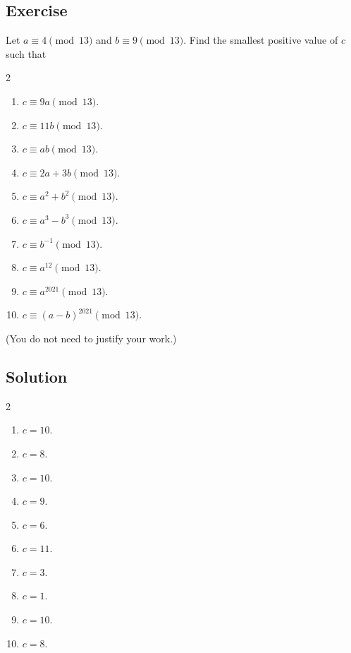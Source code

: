 \documentclass{article}
\newcounter{counter}
\newcommand{\Exercise}{Exercise \stepcounter{counter}\thecounter}
\begin{document}
\subsection*{\Exercise}
    Let $a \equiv 4 \pmod{13}$ and $b \equiv 9 \pmod{13}$. Find the smallest positive value of $c$ such that
    \begin{multicols}{2}
    \begin{enumerate}
        \item $c \equiv 9a \pmod{13}$.
        \item $c \equiv 11b \pmod{13}$.
        \item $c \equiv ab \pmod{13}$.
        \item $c \equiv 2a + 3b \pmod{13}$.
        \item $c \equiv a^{2} + b^{2} \pmod{13}$.
        \item $c \equiv a^{3} - b^{3} \pmod{13}$.
        \item $c \equiv b^{-1} \pmod{13}$.
        \item $c \equiv a^{12} \pmod{13}$.
        \item $c \equiv a^{2021} \pmod{13}$.
        \item $c \equiv (a - b)^{2021} \pmod{13}$.
    \end{enumerate}
    \end{multicols}
    (You do not need to justify your work.)

\subsection*{Solution}
    \begin{multicols}{2}
    \begin{enumerate}
        \item $c = 10$.
        \item $c = 8$.
        \item $c = 10$.
        \item $c = 9$.
        \item $c = 6$.
        \item $c = 11$.
        \item $c = 3$.
        \item $c = 1$.
        \item $c = 10$.
        \item $c = 8$.
    \end{enumerate}
    \end{multicols}
\end{document}
